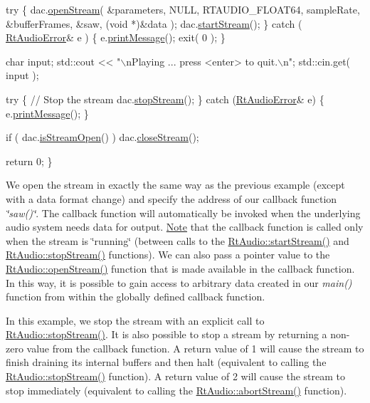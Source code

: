 \begin{DoxyCode}
  \textcolor{keywordflow}{try} \{
    dac.\hyperlink{class_rt_audio_a6907539d2527775df778ebce32ef1e3b}{openStream}( &parameters, NULL, RTAUDIO\_FLOAT64,
                    sampleRate, &bufferFrames, &saw, (\textcolor{keywordtype}{void} *)&data );
    dac.\hyperlink{class_rt_audio_aec017a89629ccef66a90b60be22a2f80}{startStream}();
  \}
  \textcolor{keywordflow}{catch} ( \hyperlink{class_rt_audio_error}{RtAudioError}& e ) \{
    e.\hyperlink{class_rt_audio_error_a0124bb90075cf3201865a0ea9b43a826}{printMessage}();
    exit( 0 );
  \}
  
  \textcolor{keywordtype}{char} input;
  std::cout << \textcolor{stringliteral}{"\(\backslash\)nPlaying ... press <enter> to quit.\(\backslash\)n"};
  std::cin.get( input );

  \textcolor{keywordflow}{try} \{
    \textcolor{comment}{// Stop the stream}
    dac.\hyperlink{class_rt_audio_af4c241ff86936ecc8108f0d9dfe3efdd}{stopStream}();
  \}
  \textcolor{keywordflow}{catch} (\hyperlink{class_rt_audio_error}{RtAudioError}& e) \{
    e.\hyperlink{class_rt_audio_error_a0124bb90075cf3201865a0ea9b43a826}{printMessage}();
  \}

  \textcolor{keywordflow}{if} ( dac.\hyperlink{class_rt_audio_a3863e45ff81dbe97176de0ee7545917f}{isStreamOpen}() ) dac.\hyperlink{class_rt_audio_a90d599002ad32cf250a4cb866f2cc93a}{closeStream}();

  \textcolor{keywordflow}{return} 0;
\}
\end{DoxyCode}


We open the stream in exactly the same way as the previous example (except with a data format change) and specify the address of our callback function {\itshape \char`\"{}saw()\char`\"{}}. The callback function will automatically be invoked when the underlying audio system needs data for output. \hyperlink{class_note}{Note} that the callback function is called only when the stream is \char`\"{}running\char`\"{} (between calls to the \hyperlink{class_rt_audio_aec017a89629ccef66a90b60be22a2f80}{Rt\+Audio\+::start\+Stream()} and \hyperlink{class_rt_audio_af4c241ff86936ecc8108f0d9dfe3efdd}{Rt\+Audio\+::stop\+Stream()} functions). We can also pass a pointer value to the \hyperlink{class_rt_audio_a6907539d2527775df778ebce32ef1e3b}{Rt\+Audio\+::open\+Stream()} function that is made available in the callback function. In this way, it is possible to gain access to arbitrary data created in our {\itshape main()} function from within the globally defined callback function.

In this example, we stop the stream with an explicit call to \hyperlink{class_rt_audio_af4c241ff86936ecc8108f0d9dfe3efdd}{Rt\+Audio\+::stop\+Stream()}. It is also possible to stop a stream by returning a non-\/zero value from the callback function. A return value of 1 will cause the stream to finish draining its internal buffers and then halt (equivalent to calling the \hyperlink{class_rt_audio_af4c241ff86936ecc8108f0d9dfe3efdd}{Rt\+Audio\+::stop\+Stream()} function). A return value of 2 will cause the stream to stop immediately (equivalent to calling the \hyperlink{class_rt_audio_ad0586b47cd6bb9591a80b4052815991f}{Rt\+Audio\+::abort\+Stream()} function). 